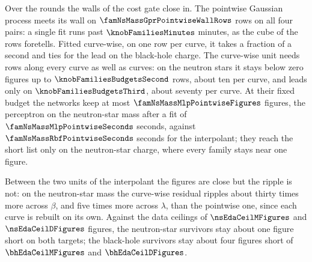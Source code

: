 Over the rounds the walls of the cost gate close in. The pointwise Gaussian process meets its wall on $\famNsMassGprPointwiseWallRows$ rows on all four pairs: a single fit runs past $\knobFamiliesMinutes$ minutes, as the cube of the rows foretells. Fitted curve-wise, on one row per curve, it takes a fraction of a second and ties for the lead on the black-hole charge. The curve-wise unit needs rows along every curve as well as curves: on the neutron stars it stays below zero figures up to $\knobFamiliesBudgetsSecond$ rows, about ten per curve, and leads only on $\knobFamiliesBudgetsThird$, about seventy per curve. At their fixed budget the networks keep at most $\famNsMassMlpPointwiseFigures$ figures, the perceptron on the neutron-star mass after a fit of $\famNsMassMlpPointwiseSeconds$ seconds, against $\famNsMassRbfPointwiseSeconds$ seconds for the interpolant; they reach the short list only on the neutron-star charge, where every family stays near one figure.

Between the two units of the interpolant the figures are close but the ripple is not: on the neutron-star mass the curve-wise residual ripples about thirty times more across $\beta$, and five times more across $\lambda$, than the pointwise one, since each curve is rebuilt on its own. Against the data ceilings of $\nsEdaCeilMFigures$ and $\nsEdaCeilDFigures$ figures, the neutron-star survivors stay about one figure short on both targets; the black-hole survivors stay about four figures short of $\bhEdaCeilMFigures$ and $\bhEdaCeilDFigures$.
\FloatBarrier



